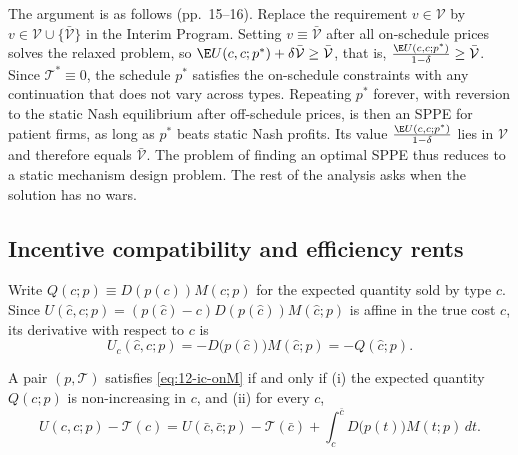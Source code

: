 The argument is as follows (pp.~15--16). Replace the requirement $v \in \mathcal V$ by $v \in \mathcal V \cup
\{\bar{\mathcal V}\}$ in the Interim Program. Setting $v \equiv \bar{\mathcal V}$ after all on-schedule prices solves
the relaxed problem, so $\E U(c, c; p^*) + \delta\bar{\mathcal V} \ge \bar{\mathcal V}$, that is,
$\frac{\E U(c, c; p^*)}{1 - \delta} \ge \bar{\mathcal V}$. Since $\mathcal T^* \equiv 0$, the schedule $p^*$
satisfies the on-schedule constraints with any continuation that does not vary across types. Repeating $p^*$ forever,
with reversion to the static Nash equilibrium after off-schedule prices, is then an SPPE for patient firms, as long as
$p^*$ beats static Nash profits. Its value $\frac{\E U(c, c; p^*)}{1 - \delta}$ lies in $\mathcal V$ and therefore
equals $\bar{\mathcal V}$. The problem of finding an optimal SPPE thus reduces to a static mechanism design problem.
The rest of the analysis asks when the solution has no wars.

\subsection{Incentive compatibility and efficiency rents}\label{sec:12-abs-ic}

Write $Q(c; p) \equiv D(p(c))M(c; p)$ for the expected quantity sold by type $c$. Since $U(\hat c, c; p) = (p(\hat c) -
c)D(p(\hat c))M(\hat c; p)$ is affine in the true cost $c$, its derivative with respect to $c$ is
\begin{equation}\label{eq:12-abs-Uc}
U_c(\hat c, c; p) = -D\bigl(p(\hat c)\bigr)M(\hat c; p) = -Q(\hat c; p).
\end{equation}

\begin{lemma}\label{lem:12-abs-envelope}
A pair $(p, \mathcal T)$ satisfies \eqref{eq:12-ic-onM} if and only if (i) the expected quantity $Q(c; p)$ is
non-increasing in $c$, and (ii) for every $c$,
\begin{equation}\label{eq:12-abs-envelope}
U(c, c; p) - \mathcal T(c) = U(\bar c, \bar c; p) - \mathcal T(\bar c) + \int_c^{\bar c}D\bigl(p(t)\bigr)M(t; p)\,dt .
\end{equation}
\end{lemma}

